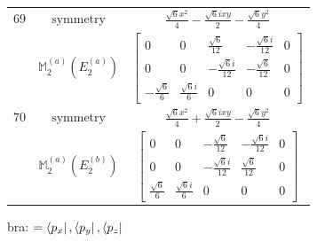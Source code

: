 \documentclass[fleqn,8pt,landscape]{jsarticle}
\begin{document}
\begin{longtable}{ccc}
$ 69 $ & $ \text{symmetry} $ & $ \frac{\sqrt{6} x^{2}}{4} - \frac{\sqrt{6} i x y}{2} - \frac{\sqrt{6} y^{2}}{4} $ \\
$  $ & $ \mathbb{M}_{2}^{(a)}(E_{2}^{(a)}) $ & $ \begin{bmatrix} 0 & 0 & \frac{\sqrt{6}}{12} & - \frac{\sqrt{6} i}{12} & 0 \\ 0 & 0 & - \frac{\sqrt{6} i}{12} & - \frac{\sqrt{6}}{12} & 0 \\ - \frac{\sqrt{6}}{6} & \frac{\sqrt{6} i}{6} & 0 & 0 & 0 \end{bmatrix} $ \\ \hline
$ 70 $ & $ \text{symmetry} $ & $ \frac{\sqrt{6} x^{2}}{4} + \frac{\sqrt{6} i x y}{2} - \frac{\sqrt{6} y^{2}}{4} $ \\
$  $ & $ \mathbb{M}_{2}^{(a)}(E_{2}^{(b)}) $ & $ \begin{bmatrix} 0 & 0 & - \frac{\sqrt{6}}{12} & - \frac{\sqrt{6} i}{12} & 0 \\ 0 & 0 & - \frac{\sqrt{6} i}{12} & \frac{\sqrt{6}}{12} & 0 \\ \frac{\sqrt{6}}{6} & \frac{\sqrt{6} i}{6} & 0 & 0 & 0 \end{bmatrix} $ \\ \hline
\end{longtable}
bra: $=\bra{p_{x}}, \bra{p_{y}}, \bra{p_{z}}$
\end{document}
